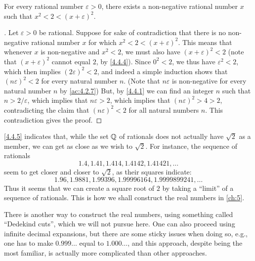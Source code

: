\begin{prop}\label{4.4.5}
  For every rational number \(\varepsilon > 0\), there exists a non-negative rational number \(x\) such that \(x^2 < 2 < (x + \varepsilon)^2\).
\end{prop}

\begin{proof}[]
  Let \(\varepsilon > 0\) be rational.
  Suppose for sake of contradiction that there is no non-negative rational number \(x\) for which \(x^2 < 2 < (x + \varepsilon)^2\).
  This means that whenever \(x\) is non-negative and \(x^2 < 2\), we must also have \((x + \varepsilon)^2 < 2\)
  (note that \((x + \varepsilon)^2\) cannot equal \(2\), by \cref{4.4.4}).
  Since \(0^2 < 2\), we thus have \(\varepsilon^2 < 2\), which then implies \((2\varepsilon)^2 < 2\), and indeed a simple induction shows that \((n\varepsilon)^2 < 2\) for every natural number \(n\).
  (Note that \(n\varepsilon\) is non-negative for every natural number \(n\) by \cref{ac:4.2.7})
  But, by \cref{4.4.1} we can find an integer \(n\) such that \(n > 2 / \varepsilon\), which implies that \(n\varepsilon > 2\), which implies that \((n\varepsilon)^2 > 4 > 2\), contradicting the claim that \((n\varepsilon)^2 < 2\) for all natural numbers \(n\).
  This contradiction gives the proof.
\end{proof}

\begin{note}
  \cref{4.4.5} indicates that, while the set \(\mathbb{Q}\) of rationals does not actually have \(\sqrt{2}\) as a member, we can get as close as we wish to \(\sqrt{2}\).
  For instance, the sequence of rationals
  \[
    1.4, 1.41, 1.414, 1.4142, 1.41421, \dots
  \]
  seem to get closer and closer to \(\sqrt{2}\), as their squares indicate:
  \[
    1.96, 1.9881, 1.99396, 1.99996164, 1.9999899241, \dots
  \]
  Thus it seems that we can create a square root of \(2\) by taking a ``limit'' of a sequence of rationals.
  This is how we shall construct the real numbers in \cref{ch:5}.
\end{note}

\begin{note}
  There is another way to construct the real numbers, using something called ``Dedekind cuts'', which we will not pursue here.
  One can also proceed using infinite decimal expansions, but there are some sticky issues when doing so, e.g., one has to make \(0.999\dots\) equal to \(1.000\dots\), and this approach, despite being the most familiar, is actually more complicated than other approaches.
\end{note}

